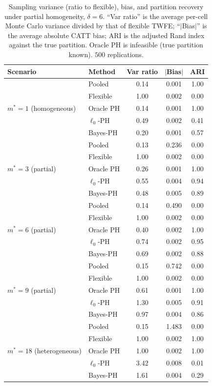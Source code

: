 \documentclass[margin=5in, 12pt]{article}
\newcommand{\1}{\mathbbm{1}}
\begin{document}
\begin{table}[H]
  \centering
  \caption{Sampling variance (ratio to flexible), bias, and partition recovery
  under partial homogeneity, $\delta=6$. ``Var ratio'' is the average per-cell
  Monte Carlo variance divided by that of flexible TWFE; ``$|$Bias$|$'' is the
  average absolute CATT bias; ARI is the adjusted Rand index against the true
  partition. Oracle PH is infeasible (true partition known). $500$ replications.}
  \label{tab:sim:var}
  \small
  \begin{tabular}{llccc}
    \toprule
    Scenario & Method & Var ratio & $|$Bias$|$ & ARI \\
    \midrule
    \multirow{5}{*}{$m^{\ast}=1$ (homogeneous)}
      & Pooled     & 0.14 & 0.001 & 1.00 \\
      & Flexible   & 1.00 & 0.002 & 0.00 \\
      & Oracle PH  & 0.14 & 0.001 & 1.00 \\
      & $\ell_0$-PH   & 0.49 & 0.002 & 0.41 \\
      & Bayes-PH   & 0.20 & 0.001 & 0.57 \\
    \midrule
    \multirow{5}{*}{$m^{\ast}=3$ (partial)}
      & Pooled     & 0.13 & 0.236 & 0.00 \\
      & Flexible   & 1.00 & 0.002 & 0.00 \\
      & Oracle PH  & 0.26 & 0.001 & 1.00 \\
      & $\ell_0$-PH   & 0.55 & 0.004 & 0.94 \\
      & Bayes-PH   & 0.48 & 0.005 & 0.89 \\
    \midrule
    \multirow{5}{*}{$m^{\ast}=6$ (partial)}
      & Pooled     & 0.14 & 0.490 & 0.00 \\
      & Flexible   & 1.00 & 0.002 & 0.00 \\
      & Oracle PH  & 0.40 & 0.002 & 1.00 \\
      & $\ell_0$-PH   & 0.74 & 0.002 & 0.95 \\
      & Bayes-PH   & 0.69 & 0.002 & 0.88 \\
    \midrule
    \multirow{5}{*}{$m^{\ast}=9$ (partial)}
      & Pooled     & 0.15 & 0.742 & 0.00 \\
      & Flexible   & 1.00 & 0.002 & 0.00 \\
      & Oracle PH  & 0.61 & 0.001 & 1.00 \\
      & $\ell_0$-PH   & 1.30 & 0.005 & 0.91 \\
      & Bayes-PH   & 0.97 & 0.004 & 0.86 \\
    \midrule
    \multirow{5}{*}{$m^{\ast}=18$ (heterogeneous)}
      & Pooled     & 0.15 & 1.483 & 0.00 \\
      & Flexible   & 1.00 & 0.002 & 1.00 \\
      & Oracle PH  & 1.00 & 0.002 & 1.00 \\
      & $\ell_0$-PH   & 3.42 & 0.008 & 0.01 \\
      & Bayes-PH   & 1.61 & 0.004 & 0.29 \\
    \bottomrule
  \end{tabular}
\end{table}
\end{document}
